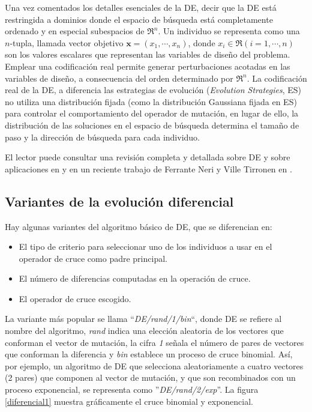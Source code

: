 Una vez comentados los detalles esenciales de la DE, decir que la DE está restringida a
dominios donde el espacio de búsqueda está completamente
ordenado y en especial subespacios de $\Re^n$. Un individuo se representa como una
$n$-tupla, llamada vector objetivo $\mathbf{x}=(x_{1},\cdots,x_{n})$, donde $x_{i} \in \Re
(i=1,\cdots,n)$ son los valores escalares que representan las variables de diseño del
problema. Emplear una codificación
real permite generar perturbaciones acotadas en las variables de diseño, a consecuencia
del orden determinado por $\Re^n$. La codificación real de la DE, a diferencia las
estrategias de evolución (\textit{Evolution Strategies}, ES) no utiliza una distribución
fijada (como la
distribución Gaussiana fijada en ES) para controlar el comportamiento del operador de
mutación, en lugar de ello, la distribución de las soluciones en el espacio de búsqueda
determina el tamaño de paso y la dirección de búsqueda para cada individuo.

El lector puede consultar una revisión completa y detallada sobre DE y sobre aplicaciones
en \cite{Price2005,Chakraborty2008,Mezuza2008,Iorio2006} y en un reciente trabajo de
Ferrante Neri y Ville Tirronen en \cite{Neri2010}.

\subsection{Variantes de la evolución diferencial}\label{variantes}
\noindent Hay algunas variantes \cite{Mezuza2008} del algoritmo básico de DE, que se
diferencian en:
\begin{itemize}
	\item El tipo de criterio para seleccionar uno de los individuos a usar en el operador
de cruce como padre principal.
	\item El número de diferencias computadas en la operación de cruce.
	\item El operador de cruce escogido.
\end{itemize}
La variante más popular se llama ``\textit{DE/rand/1/bin}``, donde DE se refiere al
nombre del algoritmo, \textit{rand} indica una elección aleatoria de los vectores que
conforman el vector de mutación, la cifra \textit{1} señala el número de pares de vectores
que conforman la diferencia y \textit{bin} establece un proceso de cruce binomial. Así,
por ejemplo, un algoritmo de DE que selecciona aleatoriamente a cuatro vectores (2 pares) que
componen al vector de mutación, y que son recombinados con un proceso exponencial, se
representa como ''\textit{DE/rand/2/exp}''. La figura \ref{diferencial1} muestra
gráficamente el cruce binomial y exponencial.

